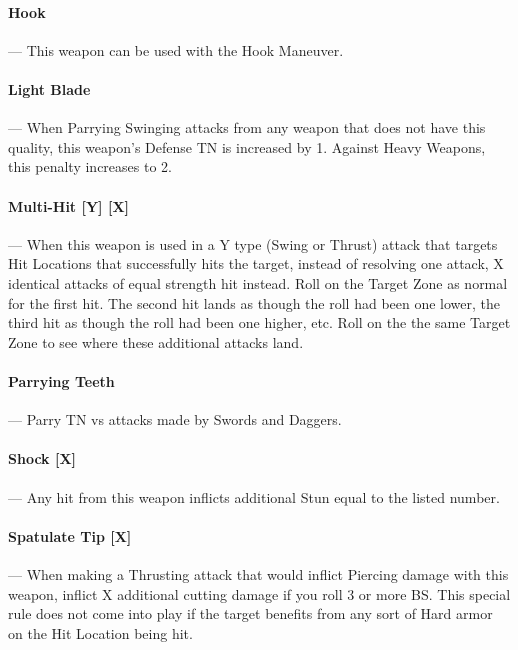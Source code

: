 \documentclass[oneside,11pt,english]{book}
\begin{document}
\paragraph{\label{par:Hook}Hook}---\quad
This weapon can be used with the Hook Maneuver. %

\paragraph{\label{par:Light Blade}Light Blade}---\quad
When Parrying Swinging attacks from any weapon that does not have this quality, this weapon’s Defense TN is increased by 1. Against Heavy Weapons, this penalty increases to 2.

\paragraph{\label{par:Multi-Hit}Multi-Hit [Y] [X]}---\quad
When this weapon is used in a Y type (Swing or Thrust) attack that targets Hit Locations that successfully hits the target, instead of resolving one attack, X identical attacks of equal strength hit instead. Roll on the Target Zone as normal for the first hit. The second hit lands as though the roll had been one lower, the third hit as though the roll had been one higher, etc. Roll on the the same Target Zone to see where these additional attacks land.

\paragraph{\label{par:Parrying Teeth}Parrying Teeth}--- Parry TN vs attacks made by Swords and Daggers.

\paragraph{\label{par:Shock}Shock [X]}---\quad
Any hit from this weapon inflicts additional Stun equal to the listed number.

\paragraph{\label{par:Spatulate Tip}Spatulate Tip [X]}---\quad
When making a Thrusting attack that would inflict Piercing damage with this weapon, inflict X additional cutting damage if you roll 3 or more BS. This special rule does not come into play if the target benefits from any sort of Hard armor on the Hit Location being hit.
\end{document}
